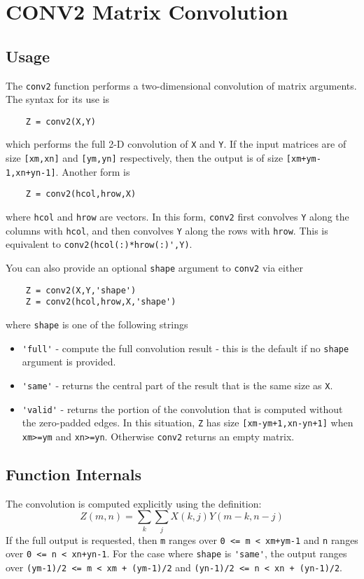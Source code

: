 \section{CONV2 Matrix Convolution}

\subsection{Usage}

The \verb|conv2| function performs a two-dimensional convolution of
matrix arguments.  The syntax for its use is
\begin{verbatim}
    Z = conv2(X,Y)
\end{verbatim}
which performs the full 2-D convolution of \verb|X| and \verb|Y|.  If the 
input matrices are of size \verb|[xm,xn]| and \verb|[ym,yn]| respectively,
then the output is of size \verb|[xm+ym-1,xn+yn-1]|.  Another form is
\begin{verbatim}
    Z = conv2(hcol,hrow,X)
\end{verbatim}
where \verb|hcol| and \verb|hrow| are vectors.  In this form, \verb|conv2|
first convolves \verb|Y| along the columns with \verb|hcol|, and then 
convolves \verb|Y| along the rows with \verb|hrow|.  This is equivalent
to \verb|conv2(hcol(:)*hrow(:)',Y)|.

You can also provide an optional \verb|shape| argument to \verb|conv2|
via either
\begin{verbatim}
    Z = conv2(X,Y,'shape')
    Z = conv2(hcol,hrow,X,'shape')
\end{verbatim}
where \verb|shape| is one of the following strings
\begin{itemize}
\item  \verb|'full'| - compute the full convolution result - this is the default if no \verb|shape| argument is provided.

\item  \verb|'same'| - returns the central part of the result that is the same size as \verb|X|.

\item  \verb|'valid'| - returns the portion of the convolution that is computed without the zero-padded edges.  In this situation, \verb|Z| has 
size \verb|[xm-ym+1,xn-yn+1]| when \verb|xm>=ym| and \verb|xn>=yn|.  Otherwise
\verb|conv2| returns an empty matrix.

\end{itemize}
\subsection{Function Internals}

The convolution is computed explicitly using the definition:
\[
  Z(m,n) = \sum_{k} \sum_{j} X(k,j) Y(m-k,n-j)
\]
If the full output is requested, then \verb|m| ranges over \verb|0 <= m < xm+ym-1|
and \verb|n| ranges over \verb|0 <= n < xn+yn-1|.  For the case where \verb|shape|
is \verb|'same'|, the output ranges over \verb|(ym-1)/2 <= m < xm + (ym-1)/2|
and \verb|(yn-1)/2 <= n < xn + (yn-1)/2|.

